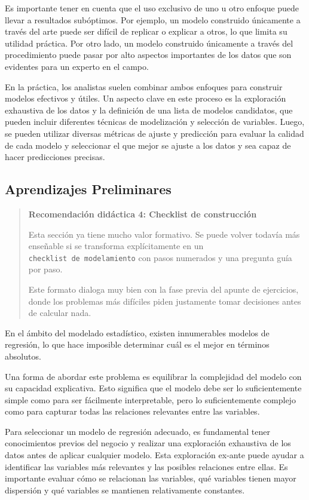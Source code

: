 \documentclass[
]{book}
\begin{document}
Es importante tener en cuenta que el uso exclusivo de uno u otro enfoque
puede llevar a resultados subóptimos. Por ejemplo, un modelo construido
únicamente a través del arte puede ser difícil de replicar o explicar a
otros, lo que limita su utilidad práctica. Por otro lado, un modelo
construido únicamente a través del procedimiento puede pasar por alto
aspectos importantes de los datos que son evidentes para un experto en
el campo.

En la práctica, los analistas suelen combinar ambos enfoques para
construir modelos efectivos y útiles. Un aspecto clave en este proceso
es la exploración exhaustiva de los datos y la definición de una lista
de modelos candidatos, que pueden incluir diferentes técnicas de
modelización y selección de variables. Luego, se pueden utilizar
diversas métricas de ajuste y predicción para evaluar la calidad de cada
modelo y seleccionar el que mejor se ajuste a los datos y sea capaz de
hacer predicciones precisas.

\hypertarget{aprendizajes-preliminares-1}{%
\subsection{Aprendizajes Preliminares}\label{aprendizajes-preliminares-1}}

\begin{quote}
\textbf{Recomendación didáctica 4: Checklist de construcción}

Esta sección ya tiene mucho valor formativo. Se puede volver todavía
más enseñable si se transforma explícitamente en un \texttt{checklist\ de\ modelamiento} con pasos numerados y una pregunta guía por paso.

Este formato dialoga muy bien con la fase previa del apunte de
ejercicios, donde los problemas más difíciles piden justamente tomar
decisiones antes de calcular nada.
\end{quote}

En el ámbito del modelado estadístico, existen innumerables modelos de
regresión, lo que hace imposible determinar cuál es el mejor en términos
absolutos.

Una forma de abordar este problema es equilibrar la complejidad del
modelo con su capacidad explicativa. Esto significa que el modelo debe
ser lo suficientemente simple como para ser fácilmente interpretable,
pero lo suficientemente complejo como para capturar todas las relaciones
relevantes entre las variables.

Para seleccionar un modelo de regresión adecuado, es fundamental tener
conocimientos previos del negocio y realizar una exploración exhaustiva
de los datos antes de aplicar cualquier modelo. Esta exploración ex-ante
puede ayudar a identificar las variables más relevantes y las posibles
relaciones entre ellas. Es importante evaluar cómo se relacionan las
variables, qué variables tienen mayor dispersión y qué variables se
mantienen relativamente constantes.
\end{document}
